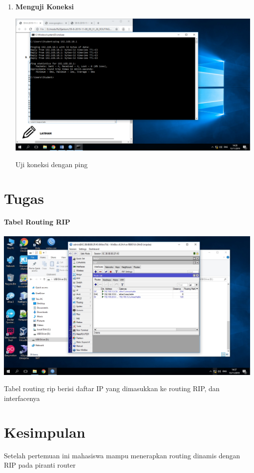 \documentclass[a4paper,12pt]{article}
\begin{document}
\begin{enumerate}
	\newpage
	
	\item \textbf{Menguji Koneksi}
	\begin{center}
		\includegraphics[scale=.4]{Page-7-Image-12}
	\end{center} 
	Uji koneksi dengan ping
	
\end{enumerate}

\newpage

\section{Tugas}
\paragraph{Tabel Routing RIP}
\begin{center}
	\includegraphics[scale=.4]{image1}
\end{center}
Tabel routing rip berisi daftar IP yang dimasukkan ke routing RIP, dan interfacenya

\newpage

\section{Kesimpulan}
Setelah pertemuan ini mahasiswa mampu menerapkan routing dinamis dengan RIP pada piranti router
\end{document}
